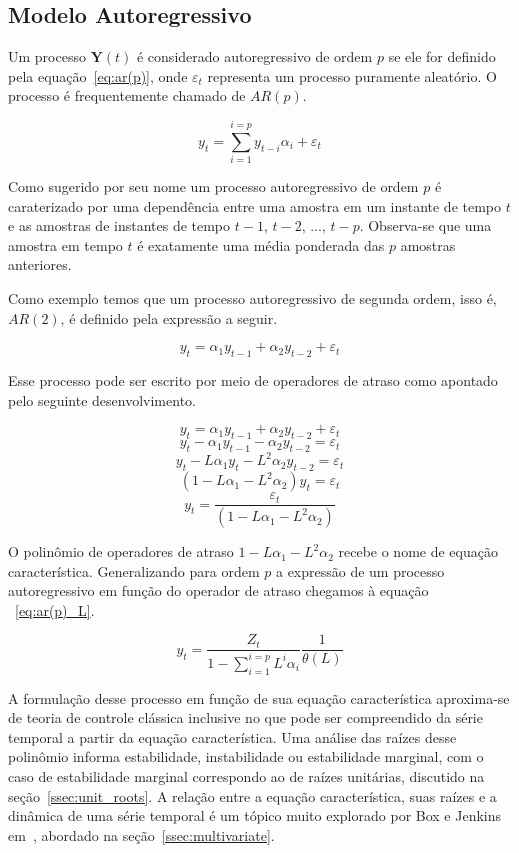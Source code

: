 \subsection{Modelo Autoregressivo}
\label{ssec:AR(p)}

Um processo $\mathbf{Y}(t)$ é considerado autoregressivo de ordem $p$ se ele
for definido pela equação~\ref{eq:ar(p)}, onde $\varepsilon_t$ representa um
processo puramente aleatório. O processo é frequentemente chamado de $AR(p)$.

\begin{equation}\label{eq:ar(p)}
   y_t = \sum_{i=1}^{i=p} y_{t-i}\alpha_i + \varepsilon_t
\end{equation}

Como sugerido por seu nome um processo autoregressivo de ordem $p$ é
caraterizado por uma dependência entre uma amostra em um instante de tempo $t$
e as amostras de instantes de tempo $t-1$, $t-2$, ..., $t-p$. Observa-se que
uma amostra em tempo $t$ é exatamente uma média ponderada das $p$ amostras
anteriores.

Como exemplo temos que um processo autoregressivo de segunda ordem, isso é,
$AR(2)$, é definido pela expressão a seguir.

$$ y_t = \alpha_1 y_{t-1} + \alpha_2 y_{t-2} + \varepsilon_t$$

Esse processo pode ser escrito por meio de operadores de atraso como apontado
pelo seguinte desenvolvimento.

$$ y_t = \alpha_1 y_{t-1} + \alpha_2 y_{t-2} + \varepsilon_t$$
$$ y_t - \alpha_1 y_{t-1} - \alpha_2 y_{t-2} = \varepsilon_t$$
$$ y_t - L\alpha_1 y_{t} - L^2\alpha_2 y_{t-2} = \varepsilon_t$$
$$ (1 - L\alpha_1 - L^2\alpha_2)y_t= \varepsilon_t$$
$$ y_t= \frac{\varepsilon_t}{(1 - L\alpha_1 - L^2\alpha_2)}$$

O polinômio de operadores de atraso $1 - L\alpha_1 - L^2\alpha_2$ recebe o
nome de equação característica. Generalizando para ordem $p$ a expressão de um
processo autoregressivo em função do operador de atraso chegamos à equação
~\ref{eq:ar(p)_L}.

\begin{equation}\label{eq:ar(p)_L}
    y_t = \frac{Z_t}{1 - \sum_{i=1}^{i=p} L^i \alpha_i} \frac{1}{\theta(L)}
\end{equation}

A formulação desse processo em função de sua equação característica aproxima-se
de teoria de controle clássica inclusive no que pode ser compreendido da série
temporal a partir da equação característica. Uma análise das raízes desse
polinômio informa estabilidade, instabilidade ou estabilidade marginal, com o
caso de estabilidade marginal correspondo ao de raízes unitárias, discutido na
seção~\ref{ssec:unit_roots}. A relação entre a equação característica, suas
raízes e a dinâmica de uma série temporal é um tópico muito explorado por
Box e Jenkins em~\cite{box}, abordado na seção~\ref{ssec:multivariate}.

